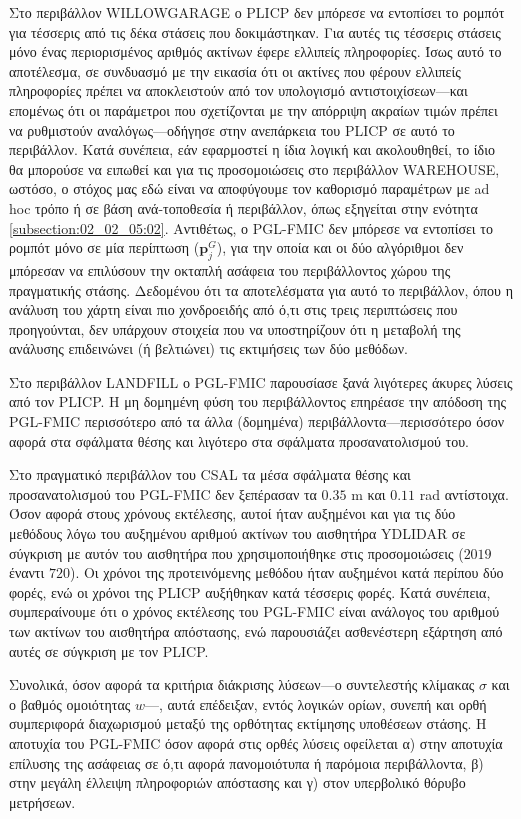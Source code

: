 Στο περιβάλλον WILLOWGARAGE ο PLICP δεν μπόρεσε να εντοπίσει το ρομπότ για
τέσσερις από τις δέκα στάσεις που δοκιμάστηκαν. Για αυτές τις τέσσερις στάσεις
μόνο ένας περιορισμένος αριθμός ακτίνων έφερε ελλιπείς πληροφορίες.  Ίσως αυτό
το αποτέλεσμα, σε συνδυασμό με την εικασία ότι οι ακτίνες που φέρουν ελλιπείς
πληροφορίες πρέπει να αποκλειστούν από τον υπολογισμό αντιστοιχίσεων---και
επομένως ότι οι παράμετροι που σχετίζονται με την απόρριψη ακραίων τιμών πρέπει
να ρυθμιστούν αναλόγως---οδήγησε στην ανεπάρκεια του PLICP σε αυτό το
περιβάλλον. Κατά συνέπεια, εάν εφαρμοστεί η ίδια λογική και ακολουθηθεί, το
ίδιο θα μπορούσε να ειπωθεί και για τις προσομοιώσεις στο περιβάλλον WAREHOUSE,
ωστόσο, ο στόχος μας εδώ είναι να αποφύγουμε τον καθορισμό παραμέτρων με ad hoc
τρόπο ή σε βάση ανά-τοποθεσία ή περιβάλλον, όπως εξηγείται στην ενότητα
\ref{subsection:02_02_05:02}. Αντιθέτως, ο PGL-FMIC δεν μπόρεσε να εντοπίσει το
ρομπότ μόνο σε μία περίπτωση ($\bm{p}_j^G$), για την οποία και οι δύο
αλγόριθμοι δεν μπόρεσαν να επιλύσουν την οκταπλή ασάφεια του περιβάλλοντος
χώρου της πραγματικής στάσης. Δεδομένου ότι τα αποτελέσματα για αυτό το
περιβάλλον, όπου η ανάλυση του χάρτη είναι πιο χονδροειδής από ό,τι στις τρεις
περιπτώσεις που προηγούνται, δεν υπάρχουν στοιχεία που να υποστηρίζουν ότι η
μεταβολή της ανάλυσης επιδεινώνει (ή βελτιώνει) τις εκτιμήσεις των δύο μεθόδων.

Στο περιβάλλον LANDFILL ο PGL-FMIC παρουσίασε ξανά λιγότερες άκυρες λύσεις από
τον PLICP.  Η μη δομημένη φύση του περιβάλλοντος επηρέασε την απόδοση της
PGL-FMIC περισσότερο από τα άλλα (δομημένα) περιβάλλοντα---περισσότερο όσον
αφορά στα σφάλματα θέσης και λιγότερο στα σφάλματα προσανατολισμού του.

Στο πραγματικό περιβάλλον του CSAL τα μέσα σφάλματα θέσης και προσανατολισμού
του PGL-FMIC δεν ξεπέρασαν τα $0.35$ m και $0.11$ rad αντίστοιχα. Όσον
αφορά στους χρόνους εκτέλεσης, αυτοί ήταν αυξημένοι και για τις δύο
μεθόδους λόγω του αυξημένου αριθμού ακτίνων του αισθητήρα YDLIDAR
σε σύγκριση με αυτόν του αισθητήρα που χρησιμοποιήθηκε στις προσομοιώσεις
($2019$ έναντι $720$). Οι χρόνοι της προτεινόμενης μεθόδου ήταν αυξημένοι
κατά περίπου δύο φορές, ενώ οι χρόνοι της PLICP αυξήθηκαν κατά τέσσερις φορές.
Κατά συνέπεια, συμπεραίνουμε ότι ο χρόνος εκτέλεσης του PGL-FMIC είναι ανάλογος
του αριθμού των ακτίνων του αισθητήρα απόστασης, ενώ παρουσιάζει ασθενέστερη
εξάρτηση από αυτές σε σύγκριση με τον PLICP.

Συνολικά, όσον αφορά τα κριτήρια διάκρισης λύσεων---ο συντελεστής κλίμακας
$\sigma$ και ο βαθμός ομοιότητας $w$---, αυτά επέδειξαν, εντός λογικών ορίων,
συνεπή και ορθή συμπεριφορά διαχωρισμού μεταξύ της ορθότητας εκτίμησης
υποθέσεων στάσης. Η αποτυχία του PGL-FMIC όσον αφορά στις ορθές λύσεις
οφείλεται α) στην αποτυχία επίλυσης της ασάφειας σε ό,τι αφορά πανομοιότυπα ή
παρόμοια περιβάλλοντα, β) στην μεγάλη έλλειψη πληροφοριών απόστασης και γ) στον
υπερβολικό θόρυβο μετρήσεων.
